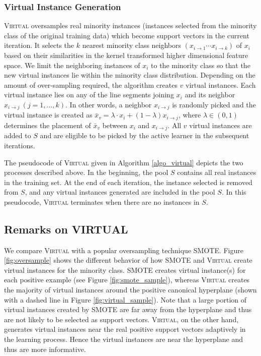 \subsubsection{Virtual Instance Generation}
\textsc{Virtual} oversamples  real minority instances (instances selected from the minority class of the original training data) which become  support vectors in the current iteration. It selects the $k$ nearest minority class neighbors $(x_{i\rightarrow 1} \cdots x_{i \rightarrow k})$ of $x_i$ based on their similarities in the kernel transformed higher dimensional feature space. We limit the neighboring instances of $x_i$ to the minority class so that the new virtual instances lie within the minority class distribution. Depending on the amount of over-sampling required, the algorithm creates $v$ virtual instances. Each virtual instance lies on any of the line segments joining $x_i$ and its neighbor $x_{i\rightarrow j}\ (j=1,...,k)$. In other words, a neighbor $x_{i \rightarrow j}$ is randomly picked and the virtual instance is created as $\bar{x}_v = \lambda \cdot x_i + (1-\lambda)x_{i \rightarrow j}$,  where $\lambda\in(0,1)$ determines the placement of $\bar{x}_v$ between $x_i$ and $x_{i \rightarrow j}$. All $v$ virtual instances are added to $S$ and are eligible to be picked by the active learner in the subsequent iterations.

The pseudocode of \textsc{Virtual} given in Algorithm \ref{algo_virtual}  depicts the two processes described above. In the beginning, the pool $S$ contains all real instances in the training set. At the end of each iteration, the instance selected is removed from $S$, and any virtual instances generated are included in the pool $S$. In this pseudocode, \textsc{Virtual} terminates when there are no instances in $S$. %

\subsection{Remarks on VIRTUAL}
We compare \textsc{Virtual} with a popular oversampling technique SMOTE. Figure \ref{fig:oversample} shows the different behavior of how SMOTE and \textsc{Virtual} create virtual instances for the minority class. SMOTE creates virtual instance(s) for each positive example (see Figure \ref{fig:smote_sample}), whereas \textsc{Virtual} creates the majority of virtual instances around the positive canonical hyperplane (shown with a dashed line in Figure \ref{fig:virtual_sample}). Note that a large portion of virtual instances created by SMOTE are far away from the hyperplane and thus are not likely to be selected as support vectors. \textsc{Virtual}, on the other hand, generates virtual instances near the real positive support vectors adaptively in the learning process. Hence the virtual instances are near the hyperplane and thus are more informative.

